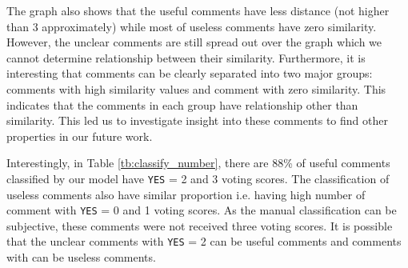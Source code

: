 The graph also shows that the useful comments have less distance (not higher than 3 approximately) while most of useless comments have zero similarity. However, the unclear comments are still spread out over the graph which we cannot determine relationship between their similarity.
Furthermore, it is interesting that comments can be clearly separated into two major groups: comments with high similarity values and comment with zero similarity. This indicates that the comments  in each group have relationship other than similarity. This led us to investigate insight into these comments to find other properties in our future work. 




Interestingly, in Table \ref{tb:classify_number}, there are 88\% of useful comments classified by our model have \texttt{YES} = 2 and 3 voting scores. The classification of useless comments also have similar proportion i.e. having high number of comment with \texttt{YES} = 0 and 1 voting scores. As the manual classification can be subjective, these comments were not received three voting scores.  It is possible that the unclear comments with \texttt{YES} = 2 can be useful comments and comments with can be useless comments. 


